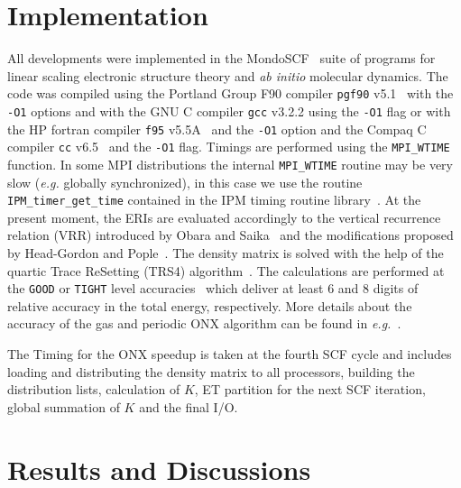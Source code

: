 \documentclass[prl,preprint,doublespace]{revtex4} %
\begin{document}
\section{Implementation}\label{Sec:Impl}
 
 All developments were implemented in the {\sc MondoSCF}~\cite{MondoSCF_1.0-alpha-10} suite of
 programs for linear scaling electronic structure theory and 
 {\it ab initio} molecular dynamics. 
 The code was compiled using the Portland Group F90 
 compiler {\tt pgf90} v5.1~\cite{pgf90-v5.1} with the {\tt -O1} options 
 and with the GNU C compiler {\tt gcc} v3.2.2 using the {\tt -O1} flag
 or with the HP fortran compiler {\tt f95} v5.5A~\cite{f95-v5.5a} 
 and the {\tt -O1} option and the Compaq C compiler {\tt cc} 
 v6.5~\cite{cc-v6.5} and the {\tt -O1} flag.
 Timings are performed using the {\tt MPI\_WTIME} function. 
 In some MPI distributions the internal {\tt MPI\_WTIME} 
 routine may be very slow ({\em e.g.} globally synchronized), 
 in this case we use the routine {\tt IPM\_timer\_get\_time} contained in 
 the IPM timing routine library~\cite{IPM}.
 At the present moment, the ERIs are evaluated accordingly to
 the vertical recurrence relation (VRR) introduced by Obara 
 and Saika~\cite{SObara86} and the modifications proposed by Head-Gordon
 and Pople~\cite{MGordon88}.
 The density matrix is solved with the help of the quartic Trace ReSetting (TRS4) algorithm~\cite{ANiklasson03}.
 The calculations are performed at the {\tt GOOD} or {\tt TIGHT} 
 level accuracies~\cite{CTymczak04b} which deliver at least 6 and 8 digits of
 relative accuracy in the total energy, respectively. 
 More details about the accuracy of the gas and periodic ONX algorithm can be 
 found in {\em e.g.}~\cite{ESchwegler97,CTymczak04b}. 

 The Timing for the ONX speedup is taken at the fourth SCF cycle
 and includes loading and distributing the density matrix to all 
 processors, building the distribution lists, calculation of $K$,
 ET partition for the next SCF iteration, global summation of $K$
 and the final I/O.


\section{Results and Discussions}\label{Sec:Disc}
\end{document}
